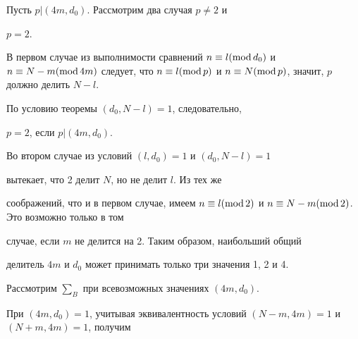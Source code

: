 Пусть $p| (4m, d_0)$. Рассмотрим два случая $p \ne 2$ и


$p=2$.





В первом случае из выполнимости сравнений $n \equiv l (\Mod


d_0)$ и $n \equiv N-m (\Mod 4m)$ следует, что $n \equiv l (\Mod


p)$ и $n \equiv N (\Mod p)$, значит, $p$ должно делить $N-l$.


По условию теоремы $(d_0,N-l)=1$, следовательно,


$p=2$, если $p|(4m, d_0)$.





Во втором случае из условий $(l, d_0)=1$ и $(d_0,N-l)=1$


вытекает, что 2 делит $N$, но не делит $l$. Из тех же


соображений, что и в первом случае, имеем $n \equiv l


(\Mod 2)$ и $n \equiv N-m (\Mod 2)$. Это возможно только в том


случае, если $m$ не делится на 2. Таким образом, наибольший общий


делитель $4m$ и $d_0$ может принимать только три значения 1, 2 и 4.





Рассмотрим $\sum_B$ при всевозможных значениях $(4m, d_0)$.





При $(4m,d_0)=1$, учитывая эквивалентность условий $(N-m,


4m)=1$ и $(N+m, 4m)=1$, получим


